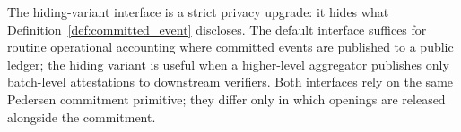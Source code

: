 \begin{remark}
The hiding-variant interface is a strict privacy upgrade: it
hides what Definition~\ref{def:committed_event} discloses.  The
default interface suffices for routine operational accounting
where committed events are published to a public ledger; the
hiding variant is useful when a higher-level aggregator publishes
only batch-level attestations to downstream verifiers.  Both
interfaces rely on the same Pedersen commitment primitive;
they differ only in which openings are released alongside the
commitment.
\end{remark}
